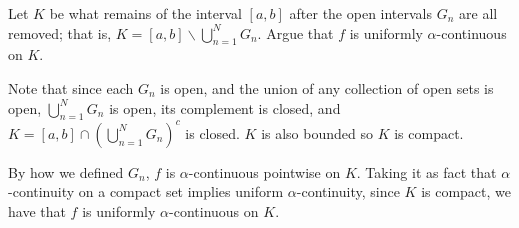 \begin{exercise}
Let \(K\) be what remains of the interval \([a,b]\) after the open intervals \(G_n\) are all removed; that is, \(K = [a,b]\backslash \bigcup^N_{n=1} G_n\). Argue that \(f\) is uniformly \(\alpha\)-continuous on \(K\).
\end{exercise}
\begin{solution}
    Note that since each \(G_n\) is open, and the union of any collection of open sets is open, \(\bigcup^N_{n=1} G_n\) is open, its complement is closed, and \(K = [a,b] \cap (\bigcup^N_{n=1} G_n)^c\) is closed. \(K\) is also bounded so \(K\) is compact.

    By how we defined \(G_n\), \(f\) is \(\alpha\)-continuous pointwise on \(K\). Taking it as fact that \(\alpha\)-continuity on a compact set implies uniform \(\alpha\)-continuity, since \(K\) is compact, we have that \(f\) is uniformly \(\alpha\)-continuous on \(K\).
\end{solution}
